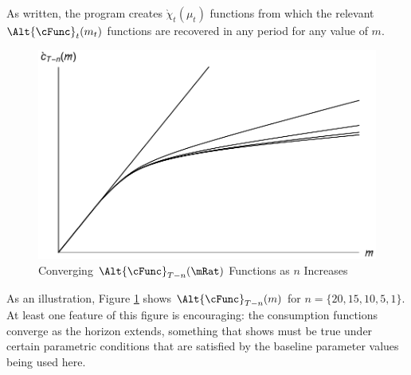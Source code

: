 \documentclass[titlepage]{\econtex}
\begin{document}
As written, the program creates \texttt{$\grave{\chi}_{t}(\mu_{t})$}
functions from which the relevant $\Alt{\cFunc}_{t}({m}_{t})$
functions are recovered in any period for any value of ${m}$.

\hypertarget{PlotCFuncsConverge}{}
\begin{figure}
  \includegraphics{./Figures/PlotCFuncsConverge}
  \caption{Converging $\Alt{\cFunc}_{T-n}({\mRat})$ Functions as $n$ Increases}
  \label{fig:PlotCFuncsConverge}
\end{figure}


As an illustration, Figure \ref{fig:PlotCFuncsConverge} shows
$\Alt{\cFunc}_{T-n}({m})$ for $n=\{20,15,10,5,1\}$.  At least one
feature of this figure is encouraging: the consumption functions
converge as the horizon extends, something that \cite{BufferStockTheory}
shows must be true under certain parametric conditions that are
satisfied by the baseline parameter values being used here.
\end{document}
